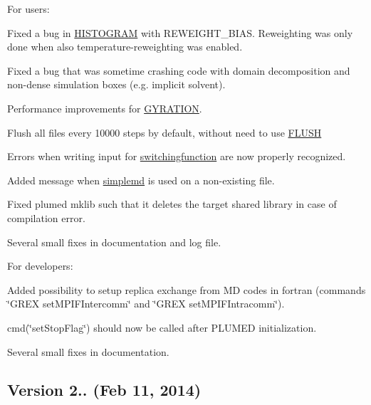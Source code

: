 For users\+:
\begin{DoxyItemize}
\item Fixed a bug in \hyperlink{HISTOGRAM}{H\+I\+S\+T\+O\+G\+R\+A\+M} with R\+E\+W\+E\+I\+G\+H\+T\+\_\+\+B\+I\+A\+S. Reweighting was only done when also temperature-\/reweighting was enabled.
\item Fixed a bug that was sometime crashing code with domain decomposition and non-\/dense simulation boxes (e.\+g. implicit solvent).
\item Performance improvements for \hyperlink{GYRATION}{G\+Y\+R\+A\+T\+I\+O\+N}.
\item Flush all files every 10000 steps by default, without need to use \hyperlink{FLUSH}{F\+L\+U\+S\+H}
\item Errors when writing input for \hyperlink{switchingfunction}{switchingfunction} are now properly recognized.
\item Added message when \hyperlink{simplemd}{simplemd} is used on a non-\/existing file.
\item Fixed {\ttfamily plumed mklib} such that it deletes the target shared library in case of compilation error.
\item Several small fixes in documentation and log file.
\end{DoxyItemize}

For developers\+:
\begin{DoxyItemize}
\item Added possibility to setup replica exchange from M\+D codes in fortran (commands \char`\"{}\+G\+R\+E\+X set\+M\+P\+I\+F\+Intercomm\char`\"{} and \char`\"{}\+G\+R\+E\+X set\+M\+P\+I\+F\+Intracomm\char`\"{}).
\item cmd(\char`\"{}set\+Stop\+Flag\char`\"{}) should now be called after P\+L\+U\+M\+E\+D initialization.
\item Several small fixes in documentation.
\end{DoxyItemize}

\subsection*{Version 2.. (Feb 11, 2014) }

